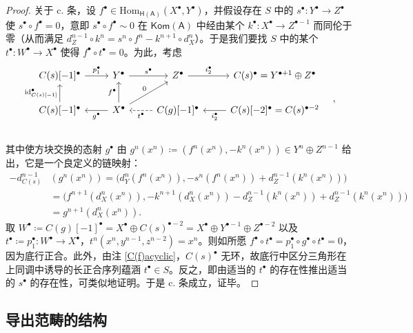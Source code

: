 \begin{proof}
	关于 c. 条，设 $f^\bullet\in\text{Hom}_\mathsf{H(A)}(X^\bullet,Y^\bullet)$，并假设存在 $S$ 中的 $s^\bullet:Y^\bullet\rightarrow Z^\bullet$ 使 $s^\bullet\circ f^\bullet=0$，意即 $s^\bullet\circ f^\bullet\sim 0$ 在 $\mathsf{Kom(A)}$ 中经由某个 $k^\bullet:X^\bullet\rightarrow Z^{\bullet-1}$ 而同伦于零（从而满足 $d_Z^{n-1}\circ k^n= s^n\circ f^n -k^{n+1}\circ d_X^n$）。于是我们要找 $S$ 中的某个 $t^\bullet:W^\bullet\rightarrow X^\bullet$ 使得 $f^\bullet\circ t^\bullet=0$。为此，考虑
	\begin{equation*}
		\begin{tikzcd}
			C(s)[-1]^\bullet\arrow[r, "{p_1^\bullet}"] & Y^\bullet\arrow[r, "s^\bullet"] & Z^\bullet\arrow[r, "{i_2^\bullet}"] & {C(s)^\bullet = Y^{\bullet+1}\oplus Z^\bullet} \\
			C(s)[-1]^\bullet\arrow[u, "{\text{id}_{C(s)[-1]}^\bullet}"] & X^\bullet\arrow[l, "g^\bullet"]\arrow[u, "f^\bullet"]\arrow[ur, "0"] & C(g)[-1]^\bullet\arrow[l, dashed, "t^\bullet"] & C(s)[-2]^\bullet=C(s)^{\bullet-2}\arrow[l, "i_2^\bullet"]\\
		\end{tikzcd}\quad,
		\vspace*{-0.3cm}
	\end{equation*}
	其中使方块交换的态射 $g^\bullet$ 由 $g^n(x^n)\coloneqq(f^n(x^n),-k^n(x^n))\in Y^n\oplus Z^{n-1}$ 给出，它是一个良定义的链映射： 
	\begin{align*}
		-d_{C(s)}^{n-1}&(g^n(x^n))=\big(d_Y^n(f^n(x^n)),-s^n(f^n(x^n))+d_Z^{n-1}(k^n(x^n))\big) \\
		&=\big(f^{n+1}(d_X^n(x^n)),-k^{n+1}(d_X^n(x^n))-d_Z^{n-1}(k^n(x^n))+d_Z^{n-1}(k^n(x^n))\big) \\
		&=g^{n+1}(d_X^n(x^n)).
	\end{align*}
	取 $W^\bullet\coloneqq C(g)[-1]^\bullet = X^\bullet\oplus C(s)^{\bullet-2}=X^\bullet\oplus Y^{\bullet-1}\oplus Z^{\bullet-2}$ 以及 $t^\bullet\coloneqq p_1^\bullet:W^\bullet\rightarrow X^\bullet$，$t^n(x^n,y^{n-1},z^{n-2})= x^n$。则如所愿 $f^\bullet\circ t^\bullet=p_1^\bullet\circ g^\bullet\circ t^\bullet=0$，因为底行正合。此外，由注 \ref{C(f)acyclic}，$C(s)^\bullet$ 无环，故底行中区分三角形在上同调中诱导的长正合序列蕴涵 $t^\bullet\in S$。反之，即由适当的 $t^\bullet$ 的存在性推出适当的 $s^\bullet$ 的存在性，可类似地证明。于是 c. 条成立，证毕。 
\end{proof} 


\subsection{导出范畴的结构}\label{ch2.5}


